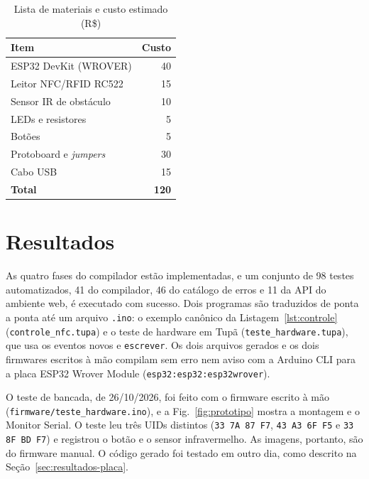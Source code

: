 \documentclass[conference]{IEEEtran}
\begin{document}
\begin{table}[htbp]
\caption{Lista de materiais e custo estimado (R\$)}
\begin{center}
\footnotesize
\begin{tabular}{lr}
\toprule
\textbf{Item} & \textbf{Custo} \\
\midrule
ESP32 DevKit (WROVER) & 40 \\
Leitor NFC/RFID RC522 & 15 \\
Sensor IR de obstáculo & 10 \\
LEDs e resistores & 5 \\
Botões & 5 \\
Protoboard e \textit{jumpers} & 30 \\
Cabo USB & 15 \\
\midrule
\textbf{Total} & \textbf{120} \\
\bottomrule
\end{tabular}
\label{tab:bom}
\end{center}
\end{table}

\section{Resultados}\label{sec:resultados}
As quatro fases do compilador estão implementadas, e um conjunto de 98
testes automatizados, 41 do compilador, 46 do catálogo de erros e 11 da API do
ambiente web, é executado com sucesso. Dois programas são traduzidos de ponta
a ponta até um arquivo \texttt{.ino}: o exemplo canônico da
Listagem~\ref{lst:controle} (\texttt{controle\_nfc.tupa}) e o teste de
hardware em Tupã (\texttt{teste\_hardware.tupa}), que usa os eventos novos e
\texttt{escrever}. Os dois arquivos gerados e os dois firmwares escritos à mão
compilam sem erro nem aviso com a Arduino CLI para a placa ESP32 Wrover Module
(\texttt{esp32:esp32:esp32wrover}).

O teste de bancada, de 26/10/2026, foi feito com o firmware escrito à mão
(\texttt{firmware/teste\_hardware.ino}), e a Fig.~\ref{fig:prototipo} mostra a
montagem e o Monitor Serial. O teste leu três UIDs distintos
(\texttt{33 7A 87 F7}, \texttt{43 A3 6F F5} e \texttt{33 8F BD F7}) e registrou
o botão e o sensor infravermelho. As imagens, portanto, são do firmware
manual. O código gerado foi testado em outro dia, como descrito na
Seção~\ref{sec:resultados-placa}.
\end{document}
